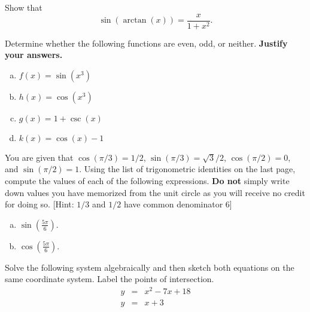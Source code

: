 \documentclass[12pt]{amsart}
\begin{document}
\newpage

\begin{thm}
  Show that
  $$\sin(\arctan(x)) = \frac{x}{1 + x^2}.$$
\end{thm}

\newpage
\begin{thm}
  Determine whether the following functions are even, odd, or neither.
  {\bf Justify your answers.}
  \begin{enumerate}[(a)]
  \item
    $f(x) = \sin(x^3)$
    \vspace{2in}
  \item
    $\displaystyle{h(x) = \cos\left(x^3\right)}$
    \vspace{2in}
  \item
    $g(x) = 1 + \csc(x)$
    \vspace{2in}
  \item
    $k(x) = \cos(x) - 1$
  \end{enumerate}
  
\end{thm}

\newpage

\begin{thm}
  You are given that $\cos(\pi/3) = 1/2$, $\sin(\pi/3) = \sqrt{3}/2$, $\cos(\pi/2) = 0$, and $\sin(\pi/2) = 1$.
  Using the list of trigonometric identities on the last page, compute the values of each of the following expressions.
  {\bf Do not} simply write down values you have memorized from the unit circle as you will receive no credit for doing so.
  [Hint: $1/3$ and $1/2$ have common denominator $6$]
  \begin{enumerate}[(a)]
  \item
    $\displaystyle{\sin\left(\frac{5\pi}{6}\right)}$.
    \vspace{3in}
  \item
    $\displaystyle{\cos\left(\frac{5\pi}{6}\right)}$.
    \vspace{3in}
  \end{enumerate}
\end{thm}

\newpage

\begin{thm}[Bonus]
  Solve the following system algebraically and then sketch both equations on the same coordinate system.
  Label the points of intersection.
  \begin{eqnarray*}
    y &=& x^2 - 7x + 18\\
    y &=& x + 3
  \end{eqnarray*}
\end{thm}
\end{document}
